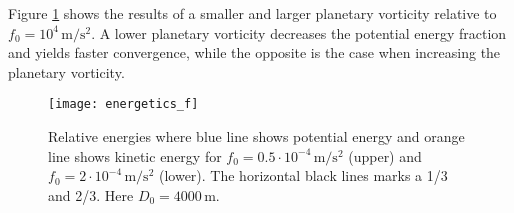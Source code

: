 Figure \ref{fig:energetics_f} shows the results of a smaller and larger planetary vorticity relative to $f_0 = 10^4\, \text{m} / \text{s}^2$. A lower planetary vorticity decreases the potential energy fraction and yields faster convergence, while the opposite is the case when increasing the planetary vorticity.
	\begin{figure}[htbp]
		\centering
		\texttt{[image: energetics\_f]}
		\caption{Relative energies where blue line shows potential energy and orange line shows kinetic energy for $f_0=0.5 \cdot 10^{-4}\,\text{m} / \text{s}^2$ (upper) and $f_0=2 \cdot 10^{-4}\, \text{m} / \text{s}^2$ (lower). The horizontal black lines marks a 1/3 and 2/3. Here $D_0 = 4000\, \text{m}$.}
		\label{fig:energetics_f}
	\end{figure}
